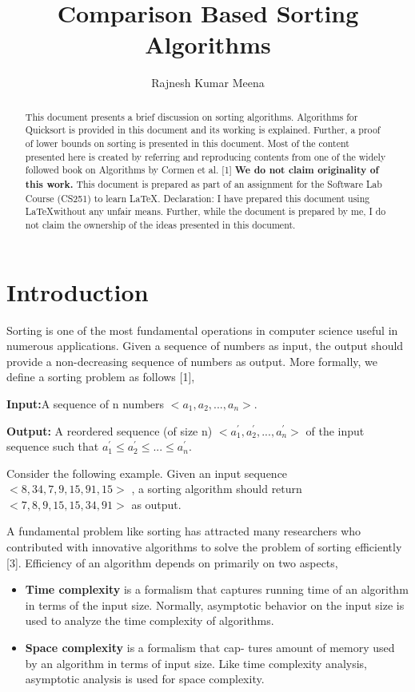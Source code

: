 \documentclass[a4paper, 10pt,twocolumn]{article}
\title{Comparison Based Sorting Algorithms}
\author{Rajnesh Kumar Meena}
\date{}
\begin{document}
\maketitle

\begin{abstract}

This document presents a brief discussion on sorting algorithms.
Algorithms for Quicksort is provided in this document and its working is explained.
Further, a proof of lower bounds on sorting is presented in this document. 
Most of the content presented here is created by referring and reproducing
contents from one of the widely followed book on Algorithms by Cormen et al. [1]
\textbf {We do not claim originality of this work.}
This document is prepared as part of an assignment for the Software Lab
Course (CS251) to learn \LaTeX.
Declaration: I have prepared this document using \LaTeX  without any unfair means. Further,
while the document is prepared by me, I do not claim the ownership of the ideas presented in this document.

\end{abstract} 

\section{Introduction}
Sorting is one of the most fundamental operations in computer science useful in numerous applications. Given a sequence of numbers as input, the
output should provide a non-decreasing sequence of numbers as output. More formally, we define a sorting problem as follows [1],


\noindent\textbf {Input:}A sequence of n numbers $<a_1,a_2,...,a_n>.$

\noindent\textbf {Output:} A reordered sequence (of size n) $ <a_1^{'},a_2^{'}, ...,a_n^{'}> $ of the input sequence such that
$ a_1^{'} \leq a_2^{'}\leq ... \leq a_n^{'}. $

\noindent Consider the following example. Given an input
sequence  $<8,34,7,9,15,91,15>$ , a sorting algorithm
should return $<7,8,9,15,15,34,91>$ as output.

A fundamental problem like sorting has attracted
many researchers who contributed with innovative
algorithms to solve the problem of sorting efficiently [3].
Efficiency of an algorithm depends on primarily on two aspects,
\begin{itemize}
\item \textbf{Time complexity} is a formalism that captures running time of an algorithm in terms of
the input size. Normally, asymptotic behavior
on the input size is used to analyze the time
complexity of algorithms.
\item \textbf{Space complexity} is a formalism that cap-
tures amount of memory used by an algorithm
in terms of input size. Like time complexity
analysis, asymptotic analysis is used for space
complexity.
\end{itemize}
\end{document}

